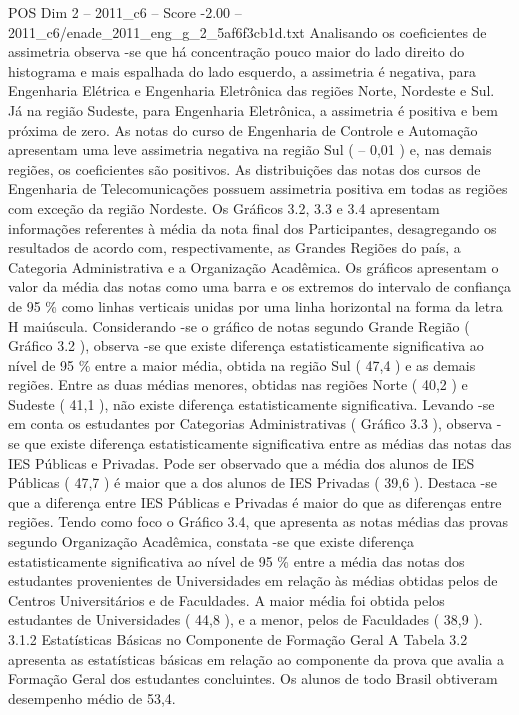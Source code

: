 \begin{textsample}{POS Dim 2 – 2011\_c6 – Score -2.00 – 2011\_c6/enade\_2011\_eng\_g\_2\_5af6f3cb1d.txt}
Analisando os coeficientes de assimetria observa -se que há concentração pouco maior do lado direito do histograma e mais espalhada do lado esquerdo, a assimetria é negativa, para Engenharia Elétrica e Engenharia Eletrônica das regiões Norte, Nordeste e Sul.
Já na região Sudeste, para Engenharia Eletrônica, a assimetria é positiva e bem próxima de zero.
As notas do curso de Engenharia de Controle e Automação apresentam uma leve assimetria negativa na região Sul ( – 0,01 ) e, nas demais regiões, os coeficientes são positivos.
As distribuições das notas dos cursos de Engenharia de Telecomunicações possuem assimetria positiva em todas as regiões com exceção da região Nordeste.
Os Gráficos 3.2, 3.3 e 3.4 apresentam informações referentes à média da nota final dos Participantes, desagregando os resultados de acordo com, respectivamente, as Grandes Regiões do país, a Categoria Administrativa e a Organização Acadêmica.
Os gráficos apresentam o valor da média das notas como uma barra e os extremos do intervalo de confiança de 95 \% como linhas verticais unidas por uma linha horizontal na forma da letra H maiúscula.
Considerando -se o gráfico de notas segundo Grande Região ( Gráfico 3.2 ), observa -se que existe diferença estatisticamente significativa ao nível de 95 \% entre a maior média, obtida na região Sul ( 47,4 ) e as demais regiões.
Entre as duas médias menores, obtidas nas regiões Norte ( 40,2 ) e Sudeste ( 41,1 ), não existe diferença estatisticamente significativa.
Levando -se em conta os estudantes por Categorias Administrativas ( Gráfico 3.3 ), observa -se que existe diferença estatisticamente significativa entre as médias das notas das IES Públicas e Privadas.
Pode ser observado que a média dos alunos de IES Públicas ( 47,7 ) é maior que a dos alunos de IES Privadas ( 39,6 ).
Destaca -se que a diferença entre IES Públicas e Privadas é maior do que as diferenças entre regiões.
Tendo como foco o Gráfico 3.4, que apresenta as notas médias das provas segundo Organização Acadêmica, constata -se que existe diferença estatisticamente significativa ao nível de 95 \% entre a média das notas dos estudantes provenientes de Universidades em relação às médias obtidas pelos de Centros Universitários e de Faculdades.
A maior média foi obtida pelos estudantes de Universidades ( 44,8 ), e a menor, pelos de Faculdades ( 38,9 ). 3.1.2 Estatísticas Básicas no Componente de Formação Geral A Tabela 3.2 apresenta as estatísticas básicas em relação ao componente da prova que avalia a Formação Geral dos estudantes concluintes.
Os alunos de todo Brasil obtiveram desempenho médio de 53,4.

\end{textsample}
